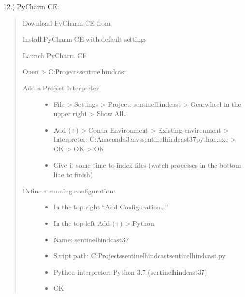 \documentclass[letterpaper,10pt,english]{sphinxmanual}
\begin{document}
12.) PyCharm CE: 
\begin{quote}

Download PyCharm CE from 

Install PyCharm CE with default settings

Launch PyCharm CE

Open \sphinxhyphen{}\textgreater{} C:Projectssentinel\sphinxhyphen{}hindcast
\begin{description}
\item[{Add a Project Interpreter}] \leavevmode\begin{itemize}
\item {} 
File \sphinxhyphen{}\textgreater{} Settings \sphinxhyphen{}\textgreater{} Project: sentinel\sphinxhyphen{}hindcast \sphinxhyphen{}\textgreater{} Gearwheel in the upper right \sphinxhyphen{}\textgreater{} Show All…

\item {} 
Add (+) \sphinxhyphen{}\textgreater{} Conda Environment \sphinxhyphen{}\textgreater{} Existing environment \sphinxhyphen{}\textgreater{} Interpreter: C:Anaconda3envssentinel\sphinxhyphen{}hindcast\sphinxhyphen{}37python.exe \sphinxhyphen{}\textgreater{} OK \sphinxhyphen{}\textgreater{} OK \sphinxhyphen{}\textgreater{} OK

\item {} 
Give it some time to index files (watch processes in the bottom line to finish)

\end{itemize}

\item[{Define a running configuration:}] \leavevmode\begin{itemize}
\item {} 
In the top right “Add Configuration…”

\item {} 
In the top left Add (+) \sphinxhyphen{}\textgreater{} Python

\item {} 
Name: sentinel\sphinxhyphen{}hindcast\sphinxhyphen{}37

\item {} 
Script path: C:Projectssentinel\sphinxhyphen{}hindcastsentinel\sphinxhyphen{}hindcast.py

\item {} 
Python interpreter: Python 3.7 (sentinel\sphinxhyphen{}hindcast\sphinxhyphen{}37)

\item {} 
OK

\end{itemize}

\end{description}
\end{quote}
\end{document}
